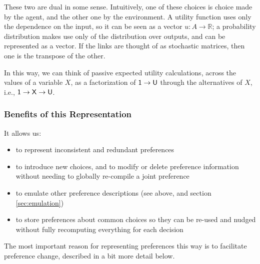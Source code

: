 \documentclass{article}
\begin{document}
	These two are dual in some sense. Intuitively, one of these choices is choice made by the agent, and the other one by the environment. A utility function uses only the dependence on the input, so it can be seen as a vector $u: A \to \mathbb R$; a probability distribution makes use only of the distribution over outputs, and can be represented as a vector. If the links are thought of as stochastic matrices, then one is the transpose of the other.
	
		
	In this way, we can think of passive expected utility calculations, across the values of a variable $X$, as a factorization of $\sf 1 \to U$ through the alternatives of $X$, i.e., $\sf 1 \to X \to U$.
	
	
	
	
	\subsubsection{Benefits of this Representation}
	It allows us:
	\begin{itemize}[nosep]
		\item to represent inconsistent and redundant preferences
		\item to introduce new choices, and to modify or delete preference information without needing to globally re-compile a joint preference
		\item to emulate other preference descriptions (see above, and section \ref{sec:emulation})
		\item to store preferences about common choices so they can be re-used and nudged without fully recomputing everything for each decision
	\end{itemize}
	The most important reason for representing preferences this way is to facilitate preference change, described in a bit more detail below.
	
	
\end{document}
